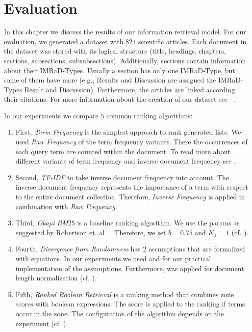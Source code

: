 \chapter{Evaluation}
\label{cha:evaluation}

In this chapter we discuss the results of our information retrieval model. For our evaluation, we generated a dataset with $821$ scientific articles. Each document in the dataset was stored with its logical structure (title, headings, chapters, sections, subsections, subsubsections). Additionally, sections contain information about their IMRaD-Types. Usually a section has only one IMRaD-Type, but some of them have more (e.g., Results and Discussion are assigned the IMRaD-Types Result and Discussion). Furthermore, the articles are linked according their citations. For more information about the creation of our dataset see ~.

In our experiments we compare $5$ common ranking algorithms:
\begin{enumerate}
  \item First, \textit{Term Frequency} is the simplest approach to rank generated lists. We used \textit{Raw Frequency} of the term frequency variants. There the occurrences of each query term are counted within the document. To read more about different variants of term frequency and inverse document frequency see .
  \item Second, \textit{TF-IDF} to take inverse document frequency into account. The inverse document frequency represents the importance of a term with respect to the entire document collection. Therefore, \textit{Inverse Frequency} is applied in combination with \textit{Raw Frequency}.
  \item Third, \textit{Okapi BM$25$} is a baseline ranking algorithm. We use the params as suggested by Robertson et. al ~\cite{RobertsonWJHG94}. Therefore, we set $b=0.75$ and $K_1 = 1$ (cf. ).
  \item Fourth, \textit{Divergence from Randomness} has $2$ assumptions that are formalized with equations. In our experiments we used  and  for our practical implementation of the assumptions. Furthermore,  was applied for document length normalization (cf. ). 
  \item Fifth, \textit{Ranked Boolean Retrieval} is a ranking method that combines zone scores with boolean expressions. The score is applied to the ranking if terms occur in the zone. The configuration of the algorithm depends on the experiment (cf. ).
\end{enumerate}

